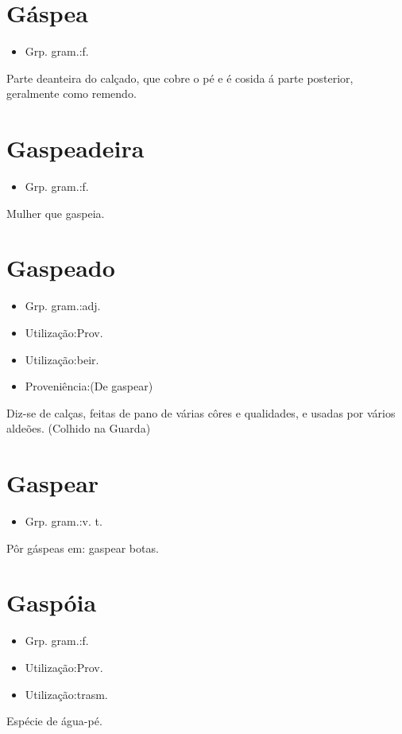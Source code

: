 \section{Gáspea}
\begin{itemize}
\item {Grp. gram.:f.}
\end{itemize}
Parte deanteira do calçado, que cobre o pé e é cosida á parte posterior, geralmente como remendo.
\section{Gaspeadeira}
\begin{itemize}
\item {Grp. gram.:f.}
\end{itemize}
Mulher que gaspeia.
\section{Gaspeado}
\begin{itemize}
\item {Grp. gram.:adj.}
\end{itemize}
\begin{itemize}
\item {Utilização:Prov.}
\end{itemize}
\begin{itemize}
\item {Utilização:beir.}
\end{itemize}
\begin{itemize}
\item {Proveniência:(De \textunderscore gaspear\textunderscore )}
\end{itemize}
Diz-se de calças, feitas de pano de várias côres e qualidades, e usadas por vários aldeões. (Colhido na Guarda)
\section{Gaspear}
\begin{itemize}
\item {Grp. gram.:v. t.}
\end{itemize}
Pôr gáspeas em: \textunderscore gaspear botas\textunderscore .
\section{Gaspóia}
\begin{itemize}
\item {Grp. gram.:f.}
\end{itemize}
\begin{itemize}
\item {Utilização:Prov.}
\end{itemize}
\begin{itemize}
\item {Utilização:trasm.}
\end{itemize}
Espécie de água-pé.
